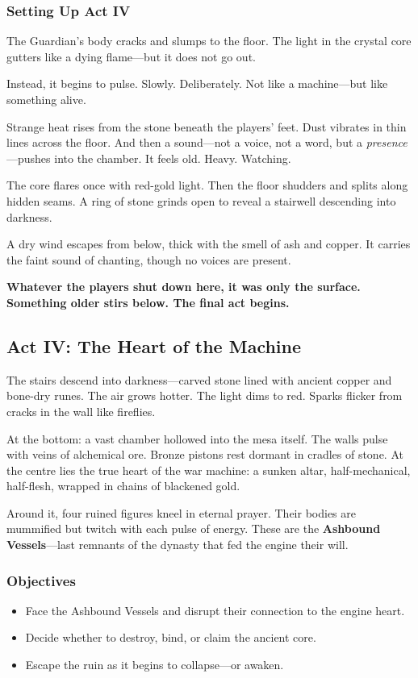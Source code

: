\subsubsection*{Setting Up Act IV}

The Guardian’s body cracks and slumps to the floor. The light in the crystal core gutters like a dying flame—but it does not go out.

Instead, it begins to pulse. Slowly. Deliberately. Not like a machine—but like something alive.

Strange heat rises from the stone beneath the players' feet. Dust vibrates in thin lines across the floor. And then a sound—not a voice, not a word, but a \emph{presence}—pushes into the chamber. It feels old. Heavy. Watching.

The core flares once with red-gold light. Then the floor shudders and splits along hidden seams. A ring of stone grinds open to reveal a stairwell descending into darkness.

A dry wind escapes from below, thick with the smell of ash and copper. It carries the faint sound of chanting, though no voices are present.

\textbf{Whatever the players shut down here, it was only the surface. Something older stirs below. The final act begins.}





\subsection{Act IV: The Heart of the Machine}

The stairs descend into darkness—carved stone lined with ancient copper and bone-dry runes. The air grows hotter. The light dims to red. Sparks flicker from cracks in the wall like fireflies.

At the bottom: a vast chamber hollowed into the mesa itself. The walls pulse with veins of alchemical ore. Bronze pistons rest dormant in cradles of stone. At the centre lies the true heart of the war machine: a sunken altar, half-mechanical, half-flesh, wrapped in chains of blackened gold.

Around it, four ruined figures kneel in eternal prayer. Their bodies are mummified but twitch with each pulse of energy. These are the \textbf{Ashbound Vessels}—last remnants of the dynasty that fed the engine their will.

\subsubsection*{Objectives}
\begin{itemize}
    \item Face the Ashbound Vessels and disrupt their connection to the engine heart.
    \item Decide whether to destroy, bind, or claim the ancient core.
    \item Escape the ruin as it begins to collapse—or awaken.
\end{itemize}

